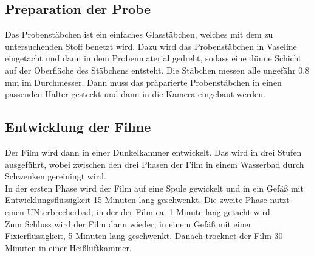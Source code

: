 \subsection{Preparation der Probe}
Das Probenstäbchen ist ein einfaches Glasstäbchen, welches mit dem zu untersuchenden Stoff benetzt wird.
Dazu wird das Probenstäbchen in Vaseline eingetacht und dann in dem Probenmaterial gedreht, sodass eine dünne Schicht auf der Oberfläche des Stäbchens entsteht. 
Die Stäbchen messen alle ungefähr 0.8 \si{\milli \meter} im Durchmesser.
Dann muss das präparierte Probenstäbchen in einen passenden Halter gesteckt und dann in die Kamera eingebaut werden.

\subsection{Entwicklung der Filme}
Der Film wird dann in einer Dunkelkammer entwickelt. 
Das wird in drei Stufen ausgeführt, wobei zwischen den drei Phasen der Film in einem Wasserbad durch Schwenken gereiningt wird.\\
In der ersten Phase wird der Film auf eine Spule gewickelt und in ein Gefäß mit Entwicklungsflüssigkeit 15 Minuten lang geschwenkt.
Die zweite Phase nutzt einen UNterbrecherbad, in der der Film ca. 1 Minute lang getacht wird. \\
Zum Schluss wird der Film dann wieder, in einem Gefäß mit einer Fixierflüssigkeit, 5 Minuten lang geschwenkt.
Danach trocknet der Film 30 Minuten in einer Heißluftkammer.
 







